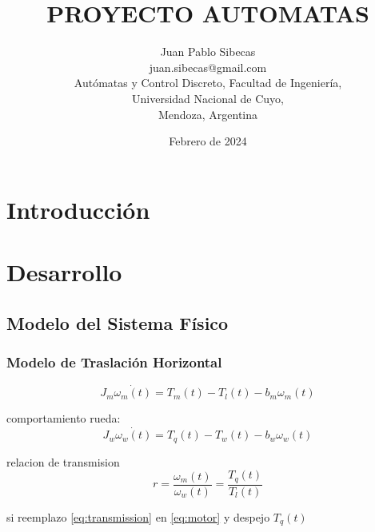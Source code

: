 \documentclass{article}
\title{PROYECTO AUTOMATAS}
\author{Juan Pablo Sibecas \\ juan.sibecas@gmail.com \\ Autómatas y Control Discreto, Facultad de Ingeniería, \\ Universidad Nacional de Cuyo, \\ Mendoza, Argentina}
\date{Febrero de 2024}
\begin{document}
\renewcommand{\tablename}{Tabla}

\maketitle

\begin{abstract}\label{sec:abstract}

\end{abstract}

\newpage

\section{Introducción} \label{sec:intro}

\section{Desarrollo} \label{sec:desarrollo}
    \subsection{Modelo del Sistema Físico} \label{sec:plantModel}

        \subsubsection{Modelo de Traslación Horizontal}

            \begin{equation} \label{eq:motor}
                J_m \dot{\omega_m(t)} = T_m(t) - T_l(t) - b_m \omega_m(t)
            \end{equation}

            comportamiento rueda:
            \begin{equation} \label{eq:wheel}
                J_w \dot{\omega_w(t)} = T_q(t) - T_w(t) - b_w \omega_w(t)
            \end{equation}

            relacion de transmision
            \begin{equation} \label{eq:transmission}
                r = \frac{\omega_m(t)}{\omega_w(t)} = \frac{T_q(t)}{T_l(t)}
            \end{equation}

            si reemplazo \ref{eq:transmission} en \ref{eq:motor} y despejo $T_q(t)$
\end{document}
